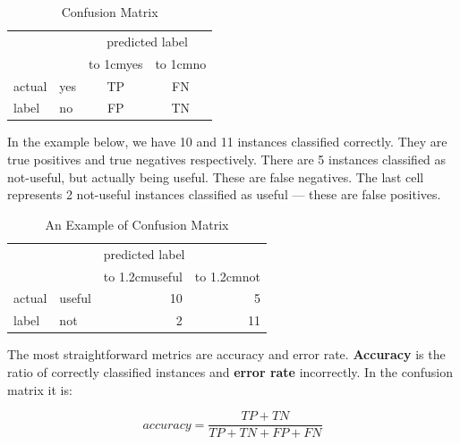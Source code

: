 
\begin{table}[h!]
\center
\begin{tabular}{ll|c|c|}
\cline{3-4}
& & \multicolumn{2}{c|}{predicted label} \\
\cline{3-4}
& & \hbox to 1cm{\hfil yes\hfil} & \hbox to 1cm{\hfil no\hfil} \\
\hline
\multicolumn{1}{|l|}{actual}& yes & TP & FN\\
\cline{2-4}
\multicolumn{1}{|l|}{label}						   & no & FP & TN \\
\hline

\end{tabular}
	\caption{Confusion Matrix}\label{tab:confmatrix}
\end{table}

In the example below, we have 10 and 11 instances classified correctly. 
They are true positives and true negatives respectively.
There are 5 instances classified as not-useful, but actually being useful.
These are false negatives.
The last cell represents 2 not-useful instances classified as useful --- these are false positives.

\begin{table}[h!]
\center
\begin{tabular}{ll|r|r|}
\cline{3-4}
& & \multicolumn{2}{l|}{predicted label} \\
\cline{3-4}
& & \hbox to 1.2cm{\hfill useful\hfil} & \hbox to 1.2cm{\hfill not\hfil} \\
\hline
\multicolumn{1}{|l|}{actual}& useful & 10 & 5\\
\cline{2-4}
\multicolumn{1}{|l|}{label}						   & not & 2 & 11 \\

\hline

\end{tabular}
	\caption{An Example of Confusion Matrix}\label{tab:confmatrix_ex}
\end{table}


The most straightforward metrics are accuracy and error rate.
{\bf Accuracy} is the ratio of correctly classified instances and {\bf error rate} incorrectly.
In the confusion matrix it is:

\newcommand\TP{\mathit{TP}}  %
\newcommand\TN{\mathit{TN}}
\newcommand\FP{\mathit{FP}}
\newcommand\FN{\mathit{FN}}
\newcommand\ALL{\mathit{All}}
\begin{equation}
\mathit{accuracy} = \frac{\TP + \TN}{\TP + \TN + \FP + \FN}
\end{equation}

